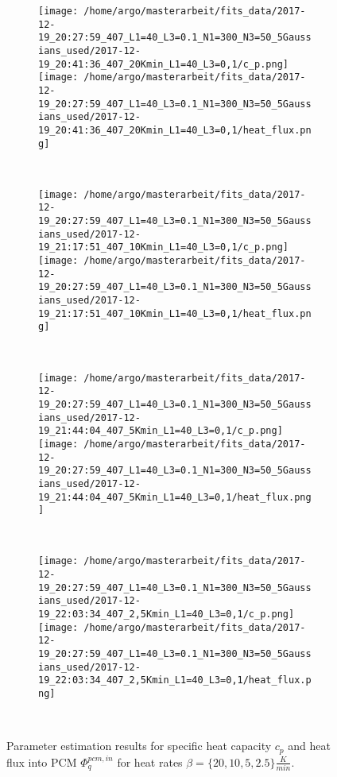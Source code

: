 \documentclass{scrartcl}[12pt, halfparskip]
\numberwithin{equation}{section}
\numberwithin{figure}{section}
\numberwithin{table}{section}
\begin{document}
\begin{figure}[H]
	\begin{subfigure}{1.\textwidth}
		\texttt{[image: /home/argo/masterarbeit/fits\_data/2017-12-19\_20:27:59\_407\_L1=40\_L3=0.1\_N1=300\_N3=50\_5Gaussians\_used/2017-12-19\_20:41:36\_407\_20Kmin\_L1=40\_L3=0,1/c\_p.png]}
		\texttt{[image: /home/argo/masterarbeit/fits\_data/2017-12-19\_20:27:59\_407\_L1=40\_L3=0.1\_N1=300\_N3=50\_5Gaussians\_used/2017-12-19\_20:41:36\_407\_20Kmin\_L1=40\_L3=0,1/heat\_flux.png]}
	\end{subfigure} \\[1ex]
	
	\begin{subfigure}{1.\textwidth}
		\texttt{[image: /home/argo/masterarbeit/fits\_data/2017-12-19\_20:27:59\_407\_L1=40\_L3=0.1\_N1=300\_N3=50\_5Gaussians\_used/2017-12-19\_21:17:51\_407\_10Kmin\_L1=40\_L3=0,1/c\_p.png]}
		\texttt{[image: /home/argo/masterarbeit/fits\_data/2017-12-19\_20:27:59\_407\_L1=40\_L3=0.1\_N1=300\_N3=50\_5Gaussians\_used/2017-12-19\_21:17:51\_407\_10Kmin\_L1=40\_L3=0,1/heat\_flux.png]}
	\end{subfigure} \\[1ex]
	
	\begin{subfigure}{1.\textwidth}
		\texttt{[image: /home/argo/masterarbeit/fits\_data/2017-12-19\_20:27:59\_407\_L1=40\_L3=0.1\_N1=300\_N3=50\_5Gaussians\_used/2017-12-19\_21:44:04\_407\_5Kmin\_L1=40\_L3=0,1/c\_p.png]}
		\texttt{[image: /home/argo/masterarbeit/fits\_data/2017-12-19\_20:27:59\_407\_L1=40\_L3=0.1\_N1=300\_N3=50\_5Gaussians\_used/2017-12-19\_21:44:04\_407\_5Kmin\_L1=40\_L3=0,1/heat\_flux.png]}
	\end{subfigure} \\[1ex]
	
	\begin{subfigure}{1.\textwidth}
		\texttt{[image: /home/argo/masterarbeit/fits\_data/2017-12-19\_20:27:59\_407\_L1=40\_L3=0.1\_N1=300\_N3=50\_5Gaussians\_used/2017-12-19\_22:03:34\_407\_2,5Kmin\_L1=40\_L3=0,1/c\_p.png]}
		\texttt{[image: /home/argo/masterarbeit/fits\_data/2017-12-19\_20:27:59\_407\_L1=40\_L3=0.1\_N1=300\_N3=50\_5Gaussians\_used/2017-12-19\_22:03:34\_407\_2,5Kmin\_L1=40\_L3=0,1/heat\_flux.png]}
	\end{subfigure} \\[1ex]
	

	\caption{Parameter estimation results for specific heat capacity $c_p$ and heat flux into PCM $\varPhi_q^{pcm,in}$ for heat rates $\beta=\{ 20, 10, 5, 2.5 \} \frac{K}{min}$.}
	\label{fig:optim_c_p_heat_flux_5Gaussians_1}
\end{figure}
\end{document}
